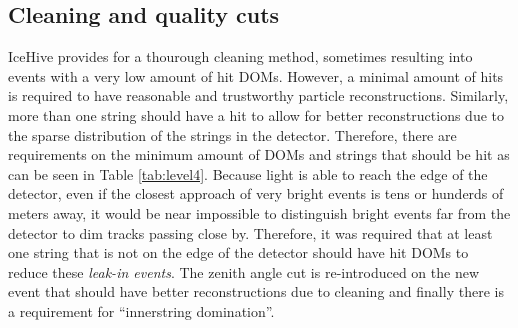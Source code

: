\begin{table}[]
\caption{Overview of quality cuts in Level 4.}
\label{tab:level4}
\end{table}

\subsection{Cleaning and quality cuts}
\noindent IceHive provides for a thourough cleaning method, sometimes resulting into events with a very low amount of hit DOMs. However, a minimal amount of hits is required to have reasonable and trustworthy particle reconstructions. Similarly, more than one string should have a hit to allow for better reconstructions due to the sparse distribution of the strings in the detector. Therefore, there are requirements on the minimum amount of DOMs and strings that should be hit as can be seen in Table \ref{tab:level4}. Because light is able to reach the edge of the detector, even if the closest approach of very bright events is tens or hunderds of meters away, it would be near impossible to distinguish bright events far from the detector to dim tracks passing close by. Therefore, it was required that at least one string that is not on the edge of the detector should have hit DOMs to reduce these \textit{leak-in events}.
The zenith angle cut is re-introduced on the new event that should have better reconstructions due to cleaning and finally there is a requirement for ``innerstring domination''.

